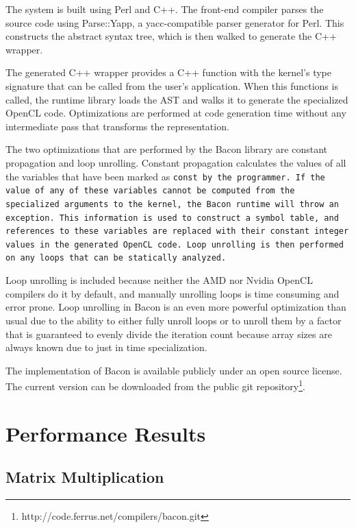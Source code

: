 \documentclass{llncs}
\begin{document}
The system is built using Perl and C++. The front-end compiler parses
the source code using Parse::Yapp\cite{parse::yapp}, a yacc-compatible
parser generator for Perl. This constructs the abstract syntax tree,
which is then walked to generate the C++ wrapper.

The generated C++ wrapper provides a C++ function with the kernel's
type signature that can be called from the user's application. When
this functions is called, the runtime library loads the AST and walks
it to generate the specialized OpenCL code. Optimizations are performed
at code generation time without any intermediate pass that transforms
the representation.

The two optimizations that are performed by the Bacon library are
constant propagation and loop unrolling. Constant propagation
calculates the values of all the variables that have been marked as
\tt{const} by the programmer. If the value of any of these variables
cannot be computed from the specialized arguments to the kernel, the
Bacon runtime will throw an exception.  This information is used to
construct a symbol table, and references to these variables are
replaced with their constant integer values in the generated OpenCL
code. Loop unrolling is then performed on any loops that can be
statically analyzed.

Loop unrolling is included because neither the AMD nor Nvidia OpenCL
compilers do it by default, and manually unrolling loops is time
consuming and error prone. Loop unrolling in Bacon is an even more
powerful optimization than usual due to the ability to either fully
unroll loops or to unroll them by a factor that is guaranteed to
evenly divide the iteration count because array sizes are always known
due to just in time specialization.

The implementation of Bacon is available publicly under an open
source license. The current version can be downloaded from the public
git repository\footnote{http://code.ferrus.net/compilers/bacon.git}.

\section{Performance Results}

\subsection{Matrix Multiplication}
\end{document}
